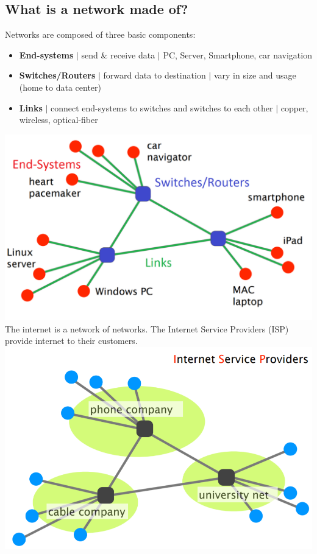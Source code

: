 \documentclass[a4paper, fontsize=8pt, landscape, DIV=1]{scrartcl}
\begin{document}
\begin{multicols*}{4}
			\subsection{What is a network made of?}
				Networks are composed of three basic components:
				\begin{itemize}
					\item \textbf{End-systems} $\vert$ send \& receive data $\vert$  PC, Server, Smartphone, car navigation
					\item \textbf{Switches/Routers} $\vert$ forward data to destination $\vert$ vary in size and usage (home to data center)
					\item \textbf{Links} $\vert$ connect end-systems to switches and switches to each other $\vert$ copper, wireless, optical-fiber
				\end{itemize}
				\includegraphics[width= \columnwidth]{images/Overview/network_components.png}
				The internet is a network of networks. The Internet Service Providers (ISP) provide internet to their customers.\\
				\includegraphics[width= \columnwidth]{images/Overview/ISP.png}
				\columnbreak
			

\end{multicols*}
\end{document}
